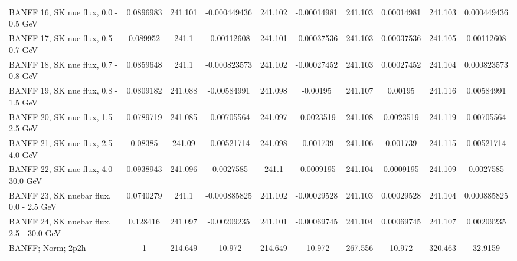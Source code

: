 \begin{tabular}{| l | S | S  S | S  S | S  S | S  S | }
                                            BANFF 16, SK nue flux, 0.0 - 0.5 GeV &       0.0896983 &         241.101 &    -0.000449436 &         241.102 &     -0.00014981 &         241.103 &      0.00014981 &         241.103 &     0.000449436 \\ 
                                            BANFF 17, SK nue flux, 0.5 - 0.7 GeV &        0.089952 &           241.1 &     -0.00112608 &         241.101 &     -0.00037536 &         241.103 &      0.00037536 &         241.105 &      0.00112608 \\ 
                                            BANFF 18, SK nue flux, 0.7 - 0.8 GeV &       0.0859648 &           241.1 &    -0.000823573 &         241.102 &     -0.00027452 &         241.103 &      0.00027452 &         241.104 &     0.000823573 \\ 
                                            BANFF 19, SK nue flux, 0.8 - 1.5 GeV &       0.0809182 &         241.088 &     -0.00584991 &         241.098 &        -0.00195 &         241.107 &         0.00195 &         241.116 &      0.00584991 \\ 
                                            BANFF 20, SK nue flux, 1.5 - 2.5 GeV &       0.0789719 &         241.085 &     -0.00705564 &         241.097 &      -0.0023519 &         241.108 &       0.0023519 &         241.119 &      0.00705564 \\ 
                                            BANFF 21, SK nue flux, 2.5 - 4.0 GeV &         0.08385 &          241.09 &     -0.00521714 &         241.098 &       -0.001739 &         241.106 &        0.001739 &         241.115 &      0.00521714 \\ 
                                           BANFF 22, SK nue flux, 4.0 - 30.0 GeV &       0.0938943 &         241.096 &      -0.0027585 &           241.1 &      -0.0009195 &         241.104 &       0.0009195 &         241.109 &       0.0027585 \\ 
                                         BANFF 23, SK nuebar flux, 0.0 - 2.5 GeV &       0.0740279 &           241.1 &    -0.000885825 &         241.102 &     -0.00029528 &         241.103 &      0.00029528 &         241.104 &     0.000885825 \\ 
                                        BANFF 24, SK nuebar flux, 2.5 - 30.0 GeV &        0.128416 &         241.097 &     -0.00209235 &         241.101 &     -0.00069745 &         241.104 &      0.00069745 &         241.107 &      0.00209235 \\ 
                                                               BANFF; Norm; 2p2h &               1 &         214.649 &         -10.972 &         214.649 &         -10.972 &         267.556 &          10.972 &         320.463 &         32.9159 \\ 

\end{tabular}
